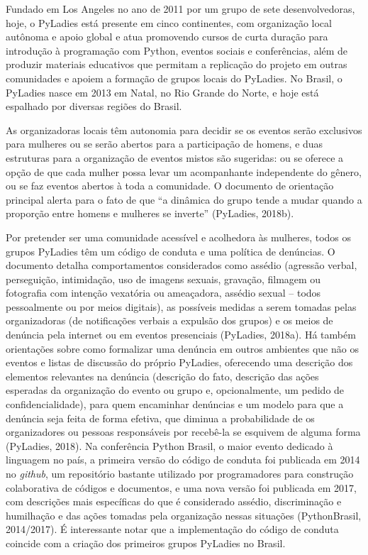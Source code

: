 Fundado em Los Angeles no ano de 2011 por um grupo de sete desenvolvedoras, hoje, o PyLadies está presente em cinco continentes, com organização local autônoma e apoio global e atua promovendo cursos de curta duração para introdução à programação com Python, eventos sociais e conferências, além de produzir materiais educativos que permitam a replicação do projeto em outras comunidades e apoiem a formação de grupos locais do PyLadies. No Brasil, o PyLadies nasce em 2013 em  Natal, no Rio Grande do Norte, e hoje está espalhado por diversas regiões do Brasil.

As organizadoras locais têm autonomia para decidir se os eventos serão exclusivos para mulheres ou se serão abertos para a participação de homens, e duas estruturas para a organização de eventos mistos são sugeridas: ou se oferece a opção de que cada mulher possa levar um acompanhante independente do gênero, ou se faz eventos abertos à toda a comunidade. O documento de orientação principal alerta para o fato de que “a dinâmica do grupo tende a mudar quando a proporção entre homens e mulheres se inverte” (PyLadies, 2018b).

Por pretender ser uma comunidade acessível e acolhedora às mulheres, todos os grupos PyLadies têm um código de conduta e uma política de denúncias. O documento detalha comportamentos considerados como assédio (agressão verbal, perseguição, intimidação, uso de imagens sexuais, gravação, filmagem ou fotografia com intenção vexatória ou ameaçadora, assédio sexual – todos pessoalmente ou por meios digitais), as possíveis medidas a serem tomadas pelas organizadoras (de notificações verbais a expulsão dos grupos) e os meios de denúncia pela internet ou em eventos presenciais (PyLadies, 2018a). Há também orientações sobre como formalizar uma denúncia em outros ambientes que não os eventos e listas de discussão do próprio PyLadies, oferecendo uma descrição dos elementos relevantes na denúncia (descrição do fato, descrição das ações esperadas da organização do evento ou grupo e, opcionalmente, um pedido de confidencialidade), para quem encaminhar denúncias e um modelo para que a denúncia seja feita de forma efetiva, que diminua a probabilidade de os organizadores ou pessoas responsáveis por recebê-la se esquivem de alguma forma (PyLadies, 2018). Na conferência Python Brasil, o maior evento dedicado à linguagem no país, a primeira versão do código de conduta foi publicada em 2014 no \textit{github}, um repositório bastante utilizado por programadores para construção colaborativa de códigos e documentos, e uma nova versão foi publicada em 2017, com descrições mais específicas do que é considerado assédio, discriminação e humilhação e das ações tomadas pela organização nessas situações (PythonBrasil, 2014/2017). É interessante notar que a implementação do código de conduta coincide com a criação dos primeiros grupos PyLadies no Brasil.

